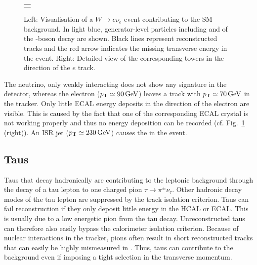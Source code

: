 \begin{figure}[!p]
\begin{tabular}{c}
\begin{minipage}[c]{0.49\textwidth}
  \end{minipage} 
  \end{tabular}
 \caption{Left: Visualisation of a $W\rightarrow e\nu_e$ event contributing to the SM background. 
          In light blue, generator-level particles including \lel and \nue of the \W-boson decay are shown. 
          Black lines represent reconstructed tracks and the red arrow indicates the missing transverse energy in the event.
          Right: Detailed view of the corresponding towers in the direction of the $e$ track.}
  \label{fig:LostElectron}
\end{figure}
The neutrino, only weakly interacting does not show any signature in the detector, whereas the electron ($p_{\text{T}}\simeq 90\,\text{Ge}\kern-0.06667em\text{V}$) leaves a track with $p_{\text{T}}\simeq 70\,\text{Ge}\kern-0.06667em\text{V}$ in the tracker. 
Only little ECAL energy deposits in the direction of the electron are visible. 
This is caused by the fact that one of the corresponding ECAL crystal is not working properly and thus no energy deposition can be recorded (cf. Fig.~\ref{fig:LostElectron} (right)).
An ISR jet ($p_{\text{T}}\simeq 230\,\text{Ge}\kern-0.06667em\text{V}$) causes the \met in the event. 
 

\subsection*{Taus}
Taus that decay hadronically are contributing to the leptonic background through the decay of a tau lepton to one charged pion $\tau\rightarrow\pi^{\pm}\nu_{\tau}$.
Other hadronic decay modes of the tau lepton are suppressed by the track isolation criterion.
Taus can fail reconstruction if they only deposit little energy in the HCAL or ECAL.
This is usually due to a low energetic pion from the tau decay.
Unreconstructed taus can therefore also easily bypass the calorimeter isolation criterion.
Because of nuclear interactions in the tracker, pions often result in short reconstructed tracks that can easily be highly mismeasured in \pt.
Thus, taus can contribute to the background even if imposing a tight selection in the transverse momentum.

